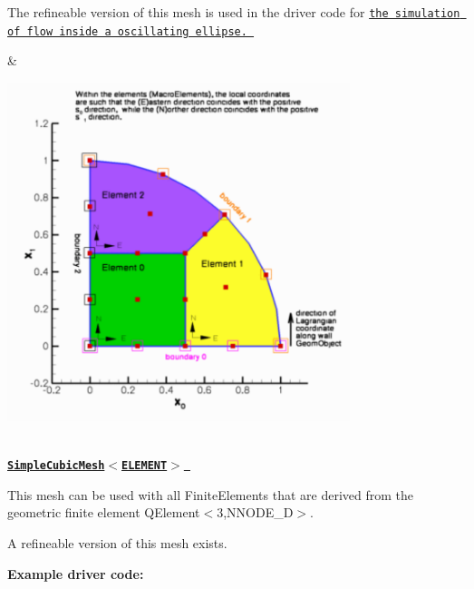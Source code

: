 \begin{center}
\begin{longtabu}
\begin{DoxyItemize}
\item The refineable version of this mesh is used in the driver code for \href{../../../navier_stokes/osc_ellipse/html/index.html}{\tt the simulation of flow inside a oscillating ellipse. }
\end{DoxyItemize}& 
\begin{DoxyImageNoCaption}
  \mbox{\includegraphics[width=0.75\textwidth]{quarter_circle_sector_mesh}}
\end{DoxyImageNoCaption}
   \\
\href{classoomph_1_1SimpleCubicMesh.html}{\tt {\bfseries  Simple\+Cubic\+Mesh$<$\+E\+L\+E\+M\+E\+N\+T$>$ }} ~\newline
~\newline

\begin{DoxyItemize}
\item This mesh can be used with all {\ttfamily Finite\+Elements} that are derived from the geometric finite element {\ttfamily Q\+Element$<$3,\+N\+N\+O\+D\+E\+\_\+D$>$}.
\item A refineable version of this mesh exists.
\end{DoxyItemize}{\bfseries Example driver code\+:} ~\newline


\end{longtabu}
\end{center}
